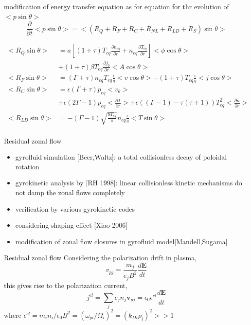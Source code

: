 \documentclass{beamer}
\begin{document}
\begin{frame}{modification of energy transfer equation}
as for equation for thr evolution of $<p\sin\theta>$
\begin{equation}
\frac{\partial}{\partial{t}}<p\sin\theta>
=<(R_Q+R_F+R_C+R_{NL}+R_{LD}+R_{S})\sin\theta>
\end{equation}

\begin{equation}
\begin{aligned}
<R_Q\sin\theta>&=
a[(1+\tau)T_{eq}\frac{\partial{n_{eq}}}{\partial{r}}+n_{eq}\frac{\partial{T_{eq}}}{\partial{r}}]<\phi\cos\theta>\\
&+(1+\tau)\beta{T_{eq}}\frac{\partial{j_0}}{\partial{r}}<A\cos\theta>\\
<R_F\sin\theta>&=
(\Gamma+\tau)n_{eq}T_{eq}\frac{\epsilon}{q}<v\cos\theta>
-(1+\tau)T_{eq}\frac{\epsilon}{q}<j\cos\theta>	\\
<R_C\sin\theta>&=
\epsilon(\Gamma+\tau)p_{eq}<v_\theta>	\\
&+\epsilon(2\Gamma-1)p_{eq}<\frac{\partial{T}}{\partial{r}}>
+\epsilon((\Gamma-1)-\tau(\tau+1))T_{eq}^2<\frac{\partial{n}}{\partial{r}}>	\\
<R_{LD}\sin\theta>&=
-(\Gamma-1)\sqrt{\frac{8T_{eq}}{\pi}}n_{eq}\frac{\epsilon}{q}<T\sin\theta>	\\
\end{aligned}
\end{equation}
\end{frame}	
%
%
%
%
\begin{frame}{Residual zonal flow}
\begin{itemize}
	\item gyrofluid simulation [Beer,Waltz]: a total collisionless decay of poloidal rotation
	\item gyrokinetic analysis by [RH 1998]: linear collisionless kinetic mechanisms do not damp the zonal flows completely
	\item verification by various gyrokinetic codes
	\item considering shaping effect [Xiao 2006]
	\item modification of zonal flow closures in gyrofluid model[Mandell,Sugama]
\end{itemize}
\end{frame}

\begin{frame}{Residual zonal flow }
Considering the polarization drift in plasma, 
\begin{equation}
v_{pj}=\frac{m_j}{e_jB^2}\frac{d\pmb{E}}{dt}
\end{equation}
this gives rise to the polarization current,
\begin{equation}
j^{cl}=\sum_{j}{e_jn_j\pmb{v}_{pj}}=\epsilon_0\epsilon^{cl}\frac{d\pmb{E}}{dt}
\end{equation}
where $\epsilon^{cl}=m_in_i/\epsilon_0B^2=(\omega_{pi}/\Omega_i)^2=(k_{Di}\rho_i)^2>>1$
\end{frame}
\end{document}
